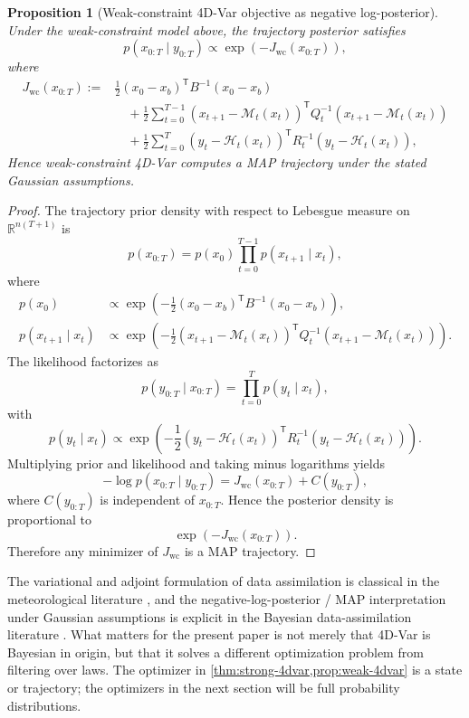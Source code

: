 \documentclass[11pt]{article}
\newcommand{\R}{\mathbb{R}}
\newcommand{\xtraj}{x_{0:T}}
\newcommand{\ytraj}{y_{0:T}}
\newcommand{\parens}[1]{\left( #1 \right)}
\newcommand{\transpose}{^{\mathsf T}}
\numberwithin{equation}{section}
\theoremstyle{plain}
\newtheorem{proposition}[theorem]{Proposition}
\theoremstyle{definition}
\theoremstyle{remark}
\begin{document}
\begin{proposition}[Weak-constraint 4D-Var objective as negative log-posterior]
\label{prop:weak-4dvar}
Under the weak-constraint model above, the trajectory posterior satisfies
\begin{equation}
p(\xtraj\mid \ytraj)
\propto
\exp\parens{-J_{\mathrm{wc}}(\xtraj)},
\end{equation}
where
\begin{align}
J_{\mathrm{wc}}(\xtraj)
:={}&
\frac12 (x_0-x_b)\transpose B^{-1}(x_0-x_b)
\nonumber\\
&\quad
+\frac12\sum_{t=0}^{T-1}
\parens{x_{t+1}-\mathcal M_t(x_t)}\transpose
Q_t^{-1}
\parens{x_{t+1}-\mathcal M_t(x_t)}
\nonumber\\
&\quad
+\frac12\sum_{t=0}^{T}
\parens{y_t-\mathcal H_t(x_t)}\transpose
R_t^{-1}
\parens{y_t-\mathcal H_t(x_t)},
\label{eq:weak-4dvar-cost}
\end{align}
Hence weak-constraint 4D-Var computes a MAP trajectory under the stated Gaussian assumptions.
\end{proposition}

\begin{proof}
The trajectory prior density with respect to Lebesgue measure on $\R^{n(T+1)}$ is
\[
p(\xtraj)
=
p(x_0)\prod_{t=0}^{T-1}p(x_{t+1}\mid x_t),
\]
where
\begin{align*}
p(x_0)
&\propto
\exp\!\left(
-\frac12 (x_0-x_b)\transpose B^{-1}(x_0-x_b)
\right),\\
p(x_{t+1}\mid x_t)
&\propto
\exp\!\left(
-\frac12
\parens{x_{t+1}-\mathcal M_t(x_t)}\transpose
Q_t^{-1}
\parens{x_{t+1}-\mathcal M_t(x_t)}
\right).
\end{align*}
The likelihood factorizes as
\[
p(\ytraj\mid \xtraj)
=
\prod_{t=0}^{T}p(y_t\mid x_t),
\]
with
\[
p(y_t\mid x_t)
\propto
\exp\!\left(
-\frac12
\parens{y_t-\mathcal H_t(x_t)}\transpose
R_t^{-1}
\parens{y_t-\mathcal H_t(x_t)}
\right).
\]
Multiplying prior and likelihood and taking minus logarithms yields
\[
-\log p(\xtraj\mid \ytraj)
=
J_{\mathrm{wc}}(\xtraj) + C(\ytraj),
\]
where $C(\ytraj)$ is independent of $\xtraj$. Hence the posterior density is proportional to
\[
\exp(-J_{\mathrm{wc}}(\xtraj)).
\]
Therefore any minimizer of $J_{\mathrm{wc}}$ is a MAP trajectory.
\end{proof}

The variational and adjoint formulation of data assimilation is classical in the meteorological literature \citep{ledimet1986,talagrandcourtier1987}, and the negative-log-posterior / MAP interpretation under Gaussian assumptions is explicit in the Bayesian data-assimilation literature \citep{lorenc1986,zupanski1997}. What matters for the present paper is not merely that 4D-Var is Bayesian in origin, but that it solves a different optimization problem from filtering over laws. The optimizer in \cref{thm:strong-4dvar,prop:weak-4dvar} is a state or trajectory; the optimizers in the next section will be full probability distributions.
\end{document}
